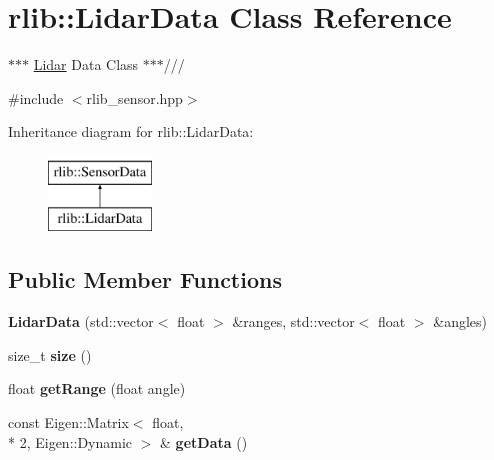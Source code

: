 \hypertarget{classrlib_1_1LidarData}{\section{rlib\-:\-:Lidar\-Data Class Reference}
\label{classrlib_1_1LidarData}
}


$\ast$$\ast$$\ast$ \hyperlink{classrlib_1_1Lidar}{Lidar} Data Class $\ast$$\ast$$\ast$///  




{\ttfamily \#include $<$rlib\-\_\-sensor.\-hpp$>$}

Inheritance diagram for rlib\-:\-:Lidar\-Data\-:\begin{figure}[H]
\begin{center}
\leavevmode
\includegraphics[height=2.000000cm]{classrlib_1_1LidarData}
\end{center}
\end{figure}
\subsection*{Public Member Functions}
\begin{DoxyCompactItemize}
\item 
\hypertarget{classrlib_1_1LidarData_a57b4749e1274030136fce1e5fbbca33d}{{\bfseries Lidar\-Data} (std\-::vector$<$ float $>$ \&ranges, std\-::vector$<$ float $>$ \&angles)}\label{classrlib_1_1LidarData_a57b4749e1274030136fce1e5fbbca33d}

\item 
\hypertarget{classrlib_1_1LidarData_abf37f41dee75528211a93833e2d68520}{size\-\_\-t {\bfseries size} ()}\label{classrlib_1_1LidarData_abf37f41dee75528211a93833e2d68520}

\item 
\hypertarget{classrlib_1_1LidarData_a7c0a03b228b5b85e81b35f2cc61e6008}{float {\bfseries get\-Range} (float angle)}\label{classrlib_1_1LidarData_a7c0a03b228b5b85e81b35f2cc61e6008}

\item 
\hypertarget{classrlib_1_1LidarData_a4249c865a00c72fe80c8a210667c2ca4}{const Eigen\-::\-Matrix$<$ float, \\*
2, Eigen\-::\-Dynamic $>$ \& {\bfseries get\-Data} ()}\label{classrlib_1_1LidarData_a4249c865a00c72fe80c8a210667c2ca4}

\end{DoxyCompactItemize}


